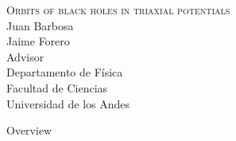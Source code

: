 \documentclass{beamer}
\begin{document}
\begin{frame}
	\centering
	\textsc{\LARGE Orbits of black holes in triaxial potentials}
	\\
	\vspace{2.5cm}
	Juan Barbosa\\
	\vspace{1cm}
	\small
	Jaime Forero\\ 
	Advisor\\
	\vspace{0.5cm}
	\footnotesize
	Departamento de F\'isica\\
	Facultad de Ciencias\\
	Universidad de los Andes
\end{frame}

\begin{frame}{Overview}
	\tableofcontents
\end{frame}
\end{document}
